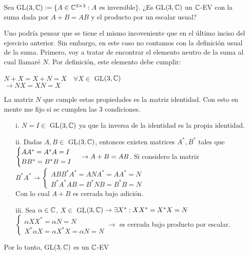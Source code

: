 \item Sea GL$(3, \mathbb{C}) := \{A \in \mathbb{C}^{3\times3} : A$ es inversible$\}$. ¿Es GL$(3, \mathbb{C})$ un $\mathbb{C}$-EV con la suma dada por $A + B = AB$ y el producto por un escalar usual?
    \begin{mdframed}[style=s]
        Uno podría pensar que se tiene el mismo incoveniente que en el último inciso del ejercicio anterior. Sin embargo, en este caso no contamos con la definición usual de la suma. Primero, voy a tratar de encontrar el elemento neutro de la suma al cual llamaré $N$. Por definición, este elemento debe cumplir:
        \begin{center}
            $N+X=X+N=X\quad\forall X\in$ GL$(3,\mathbb{C})$\\
            $\to NX=XN=X$
        \end{center}
        La matriz $N$ que cumple estas propiedades es la matriz identidad. Con esto en mente me fijo si se cumplen las 3 condiciones.
        \begin{enumerate}
            \item[i.] $N=I\in$ GL$(3,\mathbb{C})$ ya que la inversa de la identidad es la propia identidad.
            \item[ii.] Dadas $A,B\in$ GL$(3,\mathbb{C})$, entonces existen matrices $A^*,B^*$ tales que
                $\begin{cases}
                    AA^*=A^*A=I\\
                    BB^*=B^*B=I
                \end{cases}\\\to A+B=AB$. Si considero la matriz $B^*A^*\to \begin{cases}
                    ABB^*A^*=ANA^*=AA^*=N\\
                    B^*A^*AB=B^*NB=B^*B=N
                \end{cases}$\\
                Con lo cual $A+B$ es cerrada bajo adición.
            \item[iii.] Sea $\alpha\in\mathbb{C}$, $X\in$ GL$(3,\mathbb{C})\to \exists X^*:XX^*=X^*X=N$\\
                $\begin{cases}
                    \alpha XX^*=\alpha N=N\\
                    X^*\alpha X=\alpha X^*X=\alpha N=N
                \end{cases}\to$ es cerrada bajo producto por escalar.
        \end{enumerate}
        Por lo tanto, GL$(3,\mathbb{C})$ es un $\mathbb{C}$-EV
    \end{mdframed}